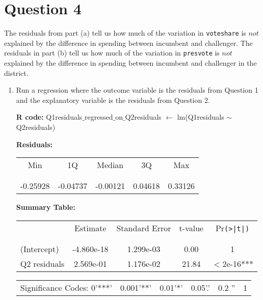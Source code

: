 \documentclass[12pt,letterpaper]{article}
\begin{document}
	\section*{Question 4}
	\noindent The residuals from part (a) tell us how much of the variation in \texttt{voteshare} is $not$ explained by the difference in spending between incumbent and challenger. The residuals in part (b) tell us how much of the variation in \texttt{presvote} is $not$ explained by the difference in spending between incumbent and challenger in the district.
	\begin{enumerate}
		\item Run a regression where the outcome variable is the residuals from Question 1 and the explanatory variable is the residuals from Question 2.
		
		\-\hspace{0.5cm}\textbf{R code:} Q1residuals$\_$regressed$\_$on$\_$Q2residuals $\gets$ lm(Q1residuals $\sim$ Q2residuals)
		\vspace{0.5cm}
		
		\begin{table}[h!]
			\-\hspace{0.5cm}\textbf{Residuals:}
			\centering
			\begin{tabular}{c c c c c}
				Min & 1Q & Median & 3Q & Max \\
				\\[-1.8ex] 
				\hline \\[-1.8ex]
				-0.25928 & -0.04737 & -0.00121 & 0.04618 & 0.33126\\
			\end{tabular}
		\end{table}
		\vspace{0.5cm}
		\begin{table}[h!]
			\-\hspace{0.5cm}\textbf{Summary Table:}
			\centering
			\begin{tabular}{l | c c c c }
				& Estimate & Standard Error & t-value & Pr\texttt{(>|t|)} \\
				\\[-1.8ex] 
				\hline \\[-1.8ex]
				(Intercept) & -4.860e-18 & 1.299e-03 & 0.00 & 1 \\
				Q2 residuals & 2.569e-01 & 1.176e-02 & 21.84 & $<$2e-16*** \\
			\end{tabular}
		\end{table}
		\vspace{0.5cm}
		\begin{table}[h!]
			\centering
			\begin{tabular}{c c c c c c}
				\\[-1.8ex] 
				Significance Codes: 0'***' & 0.001'**' & 0.01'*' & 0.05'.' & 0.2 '' & 1 \\
			\end{tabular}
		\end{table}
		

\end{enumerate}
\end{document}
